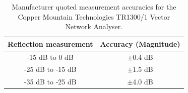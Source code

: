 \begin{table}
    \begin{center}
    \begin{tabular}{ |c|c| }
    \hline
    Reflection measurement & Accuracy (Magnitude) \\
    \hline
    -15 dB to 0 dB & $\pm$0.4 dB \\
    -25 dB to -15 dB & $\pm$1.5 dB \\
    -35 dB to -25 dB & $\pm$4.0 dB \\
    \hline
    \end{tabular}
    \caption{Manufacturer quoted measurement accuracies for the Copper Mountain Technologies TR1300/1 Vector Network Analyser.}
    \label{tab:vna_acc}
    \end{center}
\end{table}

